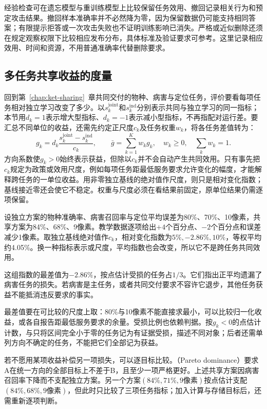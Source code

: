 经验检查可在遗忘模型与重训练模型上比较保留任务效用、撤回记录相关行为和预定攻击结果。撤回样本准确率并不必然降为零，因为保留数据仍可能支持相同答案；有限提示拒答或一次攻击失败也不证明训练影响已消失。严格或近似删除还须在规定观察权限下比较相应发布分布，具体标准及验证要求可参考。这里记录相应效用、时间和资源，不用普通准确率代替删除要求。

\subsection{多任务共享收益的度量}
\label{sec:ket-evaluation-sharing}

回到第~\ref{chap:ket-sharing}~章共同交付的物种、病害与定位任务，评价要看每项任务相对独立学习改变了多少。以$s_k^{\mathrm{joint}}$和$s_k^{\mathrm{ind}}$分别表示共同与独立学习的同一指标；本节用$d_k=1$表示增大型指标、$d_k=-1$表示减小型指标，不再指配对运行差。要汇总不同单位的收益，还需先约定正尺度$c_k$及任务权重$w_k$，将各任务差值转为：
\begin{equation}
  g_k=d_k\frac{s_k^{\mathrm{joint}}-s_k^{\mathrm{ind}}}{c_k},
  \qquad \bar g=\sum_{k=1}^{K}w_kg_k,\quad
  w_k\geq0,\quad\sum_kw_k=1.
  \label{eq:ket-evaluation-multitask-gain}
\end{equation}
方向系数使$g_k>0$始终表示获益，但除以$c_k$并不会自动产生共同效用。只有事先把$c_k$规定为政策或效用尺度，例如每项任务距最低服务要求允许变化的幅度，才能解释跨任务的一单位收益。用非零独立基线的绝对值作尺度，则只是相对变化指数；基线接近零还会使它不稳定。权重与尺度必须在看结果前固定，原单位结果仍需逐项保留。

设独立方案的物种准确率、病害召回率与定位平均误差为80\%、70\%、10像素，共享方案为84\%、68\%、9像素。教学数据逐项给出$+4$个百分点、$-2$个百分点和误差减少1像素。取独立基线绝对值作$c_k$，相对变化指数为$5\%,-2.86\%,10\%$，等权平均约4.05\%。换一种指标表示或尺度，平均指数也会改变，所以它不是跨任务共同效用。

这组指数的最差值为$-2.86\%$，按点估计受损的任务占$1/3$。它们指出正平均遗漏了病害任务的损失。若病害是主任务，或者共同交付要求不容许它退步，其他任务获益不能抵消违反要求的事实。

最差值要在可比较的尺度上取：80\%与10像素不能直接求最小，可以比较归一化收益，或各自报告距最低服务要求的余量。受损比例也依赖判据。按$g_k<0$的点估计计数，与只将区间完全小于零的任务记为有证据受损，描述不同对象；后者还需单列方向不确定的任务，不能把它们全部记为获益。

若不愿用某项收益补偿另一项损失，可以逐目标比较。（Pareto dominance）要求A在统一方向的全部目标上不差于B，且至少一项严格更好。上述共享方案因病害召回率下降而不支配独立方案。另一个方案$(84\%,71\%,9\text{像素})$按点估计支配$(84\%,68\%,9\text{像素})$，但此时只比较了三项任务指标；加入计算与存储目标后，还需重新逐项判断。

